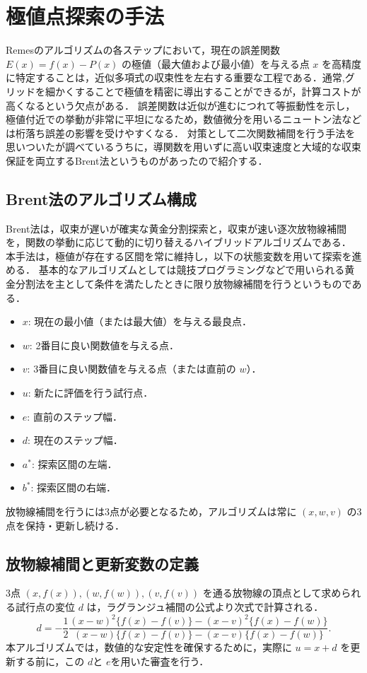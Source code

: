 \section{極値点探索の手法} %
\label{sec:extremum_search}
  Remesのアルゴリズムの各ステップにおいて，現在の誤差関数 $E(x) = f(x) - P(x)$ の極値（最大値および最小値）を与える点 $x$ を高精度に特定することは，近似多項式の収束性を左右する重要な工程である．通常,グリッドを細かくすることで極値を精密に導出することができるが，計算コストが高くなるという欠点がある．
  誤差関数は近似が進むにつれて等振動性を示し，極値付近での挙動が非常に平坦になるため，数値微分を用いるニュートン法などは桁落ち誤差の影響を受けやすくなる．
  対策として二次関数補間を行う手法を思いついたが調べているうちに，導関数を用いずに高い収束速度と大域的な収束保証を両立するBrent法というものがあったので紹介する．

  \subsection{Brent法のアルゴリズム構成}
  \label{subsec:brent_algorithm}
    Brent法は，収束が遅いが確実な黄金分割探索と，収束が速い逐次放物線補間を，関数の挙動に応じて動的に切り替えるハイブリッドアルゴリズムである．
    本手法は，極値が存在する区間を常に維持し，以下の状態変数を用いて探索を進める．
    基本的なアルゴリズムとしては競技プログラミングなどで用いられる黄金分割法を主として条件を満たしたときに限り放物線補間を行うというものである．

    \begin{itemize}
      \item $x$: 現在の最小値（または最大値）を与える最良点．
      \item $w$: 2番目に良い関数値を与える点．
      \item $v$: 3番目に良い関数値を与える点（または直前の $w$）．
      \item $u$: 新たに評価を行う試行点．
      \item $e$: 直前のステップ幅．
      \item $d$: 現在のステップ幅．
      \item $a^*$: 探索区間の左端．
      \item $b^*$: 探索区間の右端．
    \end{itemize}

    放物線補間を行うには3点が必要となるため，アルゴリズムは常に $(x, w, v)$ の3点を保持・更新し続ける．

  \subsection{放物線補間と更新変数の定義}
  \label{subsec:parabolic_interpolation}
    3点 $(x, f(x)), (w, f(w)), (v, f(v))$ を通る放物線の頂点として求められる試行点の変位 $d$ は，ラグランジュ補間の公式より次式で計算される．
    \begin{equation}
      \label{eq:parabolic_step}
      d = - \frac{1}{2} \frac{(x-w)^2 \{f(x)-f(v)\} - (x-v)^2 \{f(x)-f(w)\}}{(x-w)\{f(x)-f(v)\} - (x-v)\{f(x)-f(w)\}}.
    \end{equation}
    本アルゴリズムでは，数値的な安定性を確保するために，実際に $u = x + d$ を更新する前に，この $d$と $e$を用いた審査を行う．

